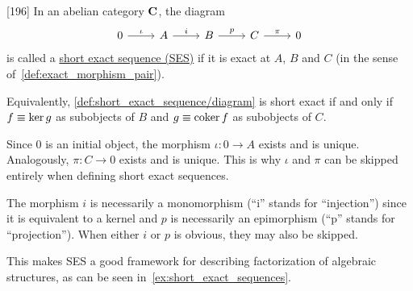 \begin{definition}\label{def:short_exact_sequence}\cite{MacLane1994}[196]
  In an abelian category $\operatorname{\mathbf{C}}$, the diagram
  \begin{equation}\label{def:short_exact_sequence/diagram}
    \begin{tikzcd}[baseline=(current bounding box.center)]
      0 \arrow[r, "\iota"] & A \arrow[r, "i"] & B \arrow[r, "p"] & C \arrow[r, "\pi"] & 0
    \end{tikzcd}
  \end{equation}
  is called a \uline{short exact sequence (SES)} if it is exact at $A$, $B$ and $C$ (in the sense of~\cref{def:exact_morphism_pair}).

  Equivalently, \cref{def:short_exact_sequence/diagram} is short exact if and only if $f \equiv \operatorname{ker} g$ as subobjects of $B$ and $g \equiv \operatorname{coker} f$ as subobjects of $C$.
\end{definition}

\begin{note}\label{note:short_exact_sequence_factorization}
  Since $0$ is an initial object, the morphism $\iota: 0 \to A$ exists and is unique. Analogously, $\pi: C \to 0$ exists and is unique. This is why $\iota$ and $\pi$ can be skipped entirely when defining short exact sequences.

  The morphism $i$ is necessarily a monomorphism (\enquote{i} stands for \enquote{injection}) since it is equivalent to a kernel and $p$ is necessarily an epimorphism (\enquote{p} stands for \enquote{projection}). When either $i$ or $p$ is obvious, they may also be skipped.

  This makes SES a good framework for describing factorization of algebraic structures, as can be seen in~\cref{ex:short_exact_sequences}.
\end{note}


